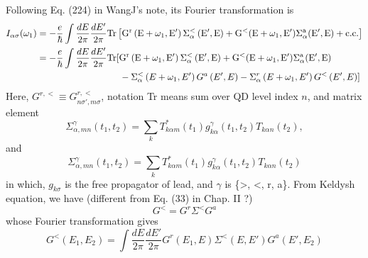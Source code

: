 \documentclass[11pt,a4paper]{article}
\begin{document}
Following Eq. (224) in WangJ's note, its Fourier transformation is
\begin{equation}
\begin{split}
I_{\alpha\sigma}(\omega_{1})&=-\frac{e}{\hbar}\int \frac{d E}{2 \pi} \frac{d E^{\prime}}{2 \pi} \rm{Tr}\left[G^{r}\left(E+\omega_{1}, E^{\prime}\right) \Sigma_{\alpha}^{<}\left(E^{\prime}, E\right) + G^{<}(E+\omega_{1}, E')\Sigma_{\alpha}^{a}(E', E) + c.c.\right]\\
&=-\frac{e}{\hbar}\int \frac{d E}{2 \pi} \frac{d E^{\prime}}{2 \pi} \rm{Tr} [ G^{r}\left(E+\omega_{1}, E^{\prime}\right) \Sigma_{\alpha}^{<}\left(E^{\prime}, E\right) + G^{<}(E+\omega_{1}, E')\Sigma_{\alpha}^{a}(E', E) \\
& \qquad \qquad \qquad\qquad\quad  -\Sigma_{\alpha}^{<}\left(E+\omega_{1}, E'\right) G^{a}\left(E', E\right)-\Sigma_{\alpha}^{r}\left(E+\omega_{1}, E'\right) G^{<} \left(E', E\right) ] \\
\end{split}
\label{eq:current3}
\end{equation}
Here, $G^{r,<} \equiv G_{n\sigma',m\sigma}^{r,<}$, notation Tr means sum over QD level index $n$, and matrix element
\begin{equation}
\Sigma_{\alpha,mn}^{\gamma}(t_{1}, t_{2}) = \sum_{k} T_{k\alpha m}^{*}(t_{1}) g_{k\alpha}^{\gamma}(t_{1}, t_{2}) T_{k\alpha n}(t_{2}),
\label{eq:sigma}
\end{equation}
and
\begin{equation}
\Sigma_{\alpha, m n}^{\gamma}\left(t_{1}, t_{2}\right)=\sum_{k} T_{k \alpha m}^{*}\left(t_{1}\right) g_{k \alpha}^{\gamma}\left(t_{1}, t_{2}\right) T_{k \alpha n}\left(t_{2}\right)
\end{equation}
in which, $g_{k\sigma}$ is the free propagator of lead, and $\gamma$ is \{>, <, r, a\}. From Keldysh equation, we have (different from Eq. (33) in Chap. II ?)
\begin{equation}
G^{<}=G^{r} \Sigma^{<} G^{a}
\label{eq:r<a}
\end{equation}
whose Fourier transformation gives
\begin{equation}
G^{<}(E_{1},E_{2})=\int\frac{dE}{2\pi}\frac{dE'}{2\pi}G^{r}(E_{1}, E) \Sigma^{<}(E, E') G^{a}(E', E_{2})
\end{equation}
\end{document}
